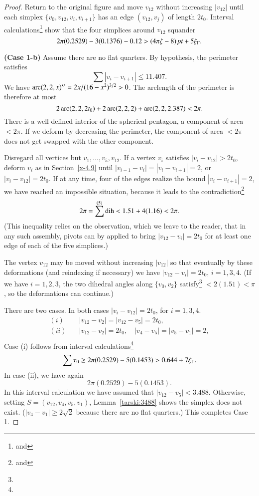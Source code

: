 \begin{proof}
Return to the original figure and move $v_{12}$ without increasing
$|v_{12}|$ until each simplex $\{v_0,v_{12},v_i,v_{i+1}\}$ has an edge
$(v_{12},v_j)$ of length $2t_0$. Interval
calculations\footnote{ and } show
that the four simplices around $v_{12}$ squander
    $$2\pi(0.2529)-3(0.1376)-0.12 > (4\pi\zeta-8)\,\hbox{\it pt} + 5\xi_\Gamma.$$

{\bf (Case 1-b)} Assume there are no flat quarters. By hypothesis,
the perimeter satisfies $$\sum|v_i-v_{i+1}|\le 11.407.$$ We have
$\operatorname{arc}(2,2,x)'' = 2x/(16-x^2)^{3/2} >0$. The arclength of the
perimeter is therefore at most
$$2\operatorname{arc}(2,2,2t_0) + 2\operatorname{arc}(2,2,2) + \operatorname{arc}(2,2,2.387) <  2\pi.$$
There is a well-defined interior of the spherical pentagon, a
component of area $<2\pi$.  If we deform by decreasing the
perimeter, the component of area $<2\pi$ does not get swapped with
the other component.

Disregard all vertices but $v_1,\ldots,v_5,v_{12}$.  If a vertex
$v_i$ satisfies  $|v_i-v_{12}|>2t_0$, deform $v_i$ as in
Section~\ref{x-4.9} until $|v_{i-1}-v_{i}|=|v_i-v_{i+1}|=2$, or
$|v_i-v_{12}|=2t_0$. If at any time, four of the edges realize the
bound $|v_i-v_{i+1}|=2$, we have reached an impossible situation,
because it leads to the contradiction\footnote{
and }
    $$2\pi = \sum^{(5)}\operatorname{dih} < 1.51 + 4 (1.16) < 2\pi.$$
(This inequality relies on the observation, which we leave to the
reader, that in any such assembly, pivots can by applied to bring
$|v_{12}-v_i|=2t_0$ for at least one edge of each of the five
simplices.)



The vertex $v_{12}$ may be moved without increasing $|v_{12}|$ so
that eventually by these deformations (and reindexing if
necessary) we have $|v_{12}-v_i|=2t_0$, $i=1,3,4$. (If we have
$i=1,2,3$, the two dihedral angles along $\{v_0,v_2\}$
satisfy\footnote{} $<2(1.51)<\pi$, so the
deformations can continue.)



There are two cases. In both cases $|v_i-v_{12}|=2t_0$, for
$i=1,3,4$.
$$
\begin{array}{lll}
(i)\quad &|v_{12}-v_2|=|v_{12}-v_5|=2t_0,\\
(ii)\quad &|v_{12}-v_2|=2t_0,\quad |v_4-v_5|=|v_5-v_1|=2,\\
\end{array}
$$
Case (i) follows from interval
calculations\footnote{}
$$
\sum\tau_0 \ge 2\pi(0.2529) - 5 (0.1453) > 0.644+7\xi_\Gamma.
$$
In case (ii), we have again
    $$2\pi(0.2529)-5 (0.1453).$$
In this interval calculation we have assumed that
$|v_{12}-v_5|<3.488$. Otherwise, setting $S=(v_{12},v_4,v_5,v_1)$, Lemma~\ref{tarski:3488}
shows the simplex does not exist.
($|v_4-v_1|\ge2\sqrt2$ because
there are no flat quarters.)
This completes Case 1.


\end{proof}
